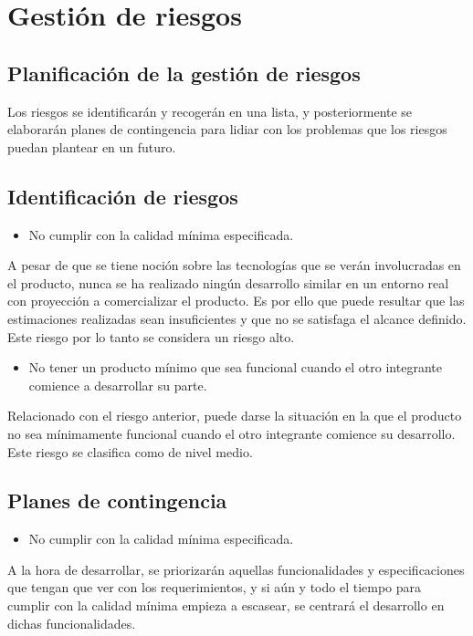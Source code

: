 \section{Gestión de riesgos}
\subsection{Planificación de la gestión de riesgos}
Los riesgos se identificarán y recogerán en una lista, y posteriormente
se elaborarán planes de contingencia para lidiar con los problemas que
los riesgos puedan plantear en un futuro.

\subsection{Identificación de riesgos}
\begin{itemize}
    \item No cumplir con la calidad mínima especificada.
\end{itemize}
A pesar de que se tiene noción sobre las tecnologías que se verán
involucradas en el producto, nunca se ha realizado ningún desarrollo
similar en un entorno real con proyección a comercializar el producto.
Es por ello que puede resultar que las estimaciones realizadas sean
insuficientes y que no se satisfaga el alcance definido. Este riesgo
por lo tanto se considera un riesgo alto.

\begin{itemize}
    \item No tener un producto mínimo que sea funcional cuando el otro
        integrante comience a desarrollar su parte.
\end{itemize}
Relacionado con el riesgo anterior, puede darse la situación en la que
el producto no sea mínimamente funcional cuando el otro integrante
comience su desarrollo. Este riesgo se clasifica como de nivel medio.

\subsection{Planes de contingencia}
\begin{itemize}
    \item No cumplir con la calidad mínima especificada.
\end{itemize}
A la hora de desarrollar, se priorizarán aquellas funcionalidades y
especificaciones que tengan que ver con los requerimientos, y si aún y
todo el tiempo para cumplir con la calidad mínima empieza a escasear,
se centrará el desarrollo en dichas funcionalidades.

